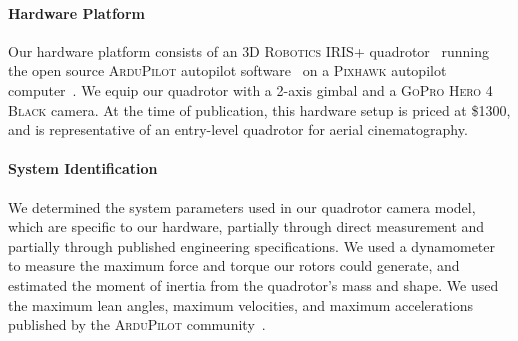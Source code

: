 \paragraph{Hardware Platform}
Our hardware platform consists of an \textsc{3D Robotics IRIS+} quadrotor~\cite{3dr_iris_p:2014} running the open source \textsc{ArduPilot} autopilot software~\cite{apm:2015} on a \textsc{Pixhawk} autopilot computer~\cite{meier:2012}.
We equip our quadrotor with a 2-axis gimbal and a \textsc{GoPro Hero 4 Black} camera.
At the time of publication, this hardware setup is priced at \$1300, and is representative of an entry-level quadrotor for aerial cinematography.  

\paragraph{System Identification}
We determined the system parameters used in our quadrotor camera model, which are specific to our hardware, partially through direct measurement and partially through published engineering specifications.
We used a dynamometer to measure the maximum force and torque our rotors could generate, and estimated the moment of inertia from the quadrotor's mass and shape.
We used the maximum lean angles, maximum velocities, and maximum accelerations published by the \textsc{ArduPilot} community~\cite{apm:2015}. 



